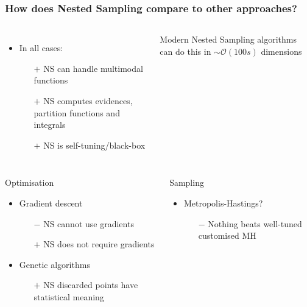 \documentclass[aspectratio=169]{beamer}
\begin{document}
\appendix
\begin{frame}
    \frametitle{How does Nested Sampling compare to other approaches?}
    \begin{columns}
        \begin{itemize}
            \item In all cases:
                \begin{itemize}
                    \item[$+$] NS can handle multimodal functions
                    \item[$+$] NS computes evidences, partition functions and integrals
                    \item[$+$] NS is self-tuning/black-box
                \end{itemize}
        \end{itemize}
        Modern Nested Sampling algorithms can do this in $\sim\mathcal{O}(100s)$ dimensions
    \end{columns}
    \begin{columns}[t]
        \begin{block}{Optimisation}
            \begin{itemize}
                \item Gradient descent
                    \begin{itemize}
                        \item[$-$] NS cannot use gradients
                        \item[$+$] NS does not require gradients
                    \end{itemize}
                \item Genetic algorithms
                    \begin{itemize}
                        \item[$+$] NS discarded points have statistical meaning
                    \end{itemize}
            \end{itemize}
        \end{block}
        \begin{block}{Sampling}
            \begin{itemize}
                \item Metropolis-Hastings?
                    \begin{itemize}
                        \item[$-$] Nothing beats well-tuned customised MH

\end{itemize}
\end{itemize}
\end{block}
\end{columns}
\end{frame}
\end{document}
